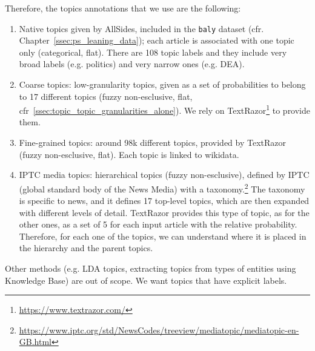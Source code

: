 Therefore, the topics annotations that we use are the following:

\begin{enumerate}
    \item Native topics given by AllSides, included in the \texttt{baly} dataset (cfr. Chapter~\ref{ssec:ps_leaning_data}); each article is associated with one topic only (categorical, flat). There are 108 topic labels and they include very broad labels (e.g. politics) and very narrow ones (e.g. DEA).
    \item Coarse topics: low-granularity topics, given as a set of probabilities to belong to 17 different topics (fuzzy non-esclusive, flat, cfr~\ref{ssec:topic_topic_granularities_alone}). We rely on TextRazor\footnote{\url{https://www.textrazor.com/}} to provide them.
    \item Fine-grained topics: around 98k different topics, provided by TextRazor (fuzzy non-esclusive, flat). Each topic is linked to wikidata.
    \item IPTC media topics: hierarchical topics (fuzzy non-esclusive),
    defined by IPTC (global standard body of the News Media) with a taxonomy.\footnote{\url{https://www.iptc.org/std/NewsCodes/treeview/mediatopic/mediatopic-en-GB.html}}
    The taxonomy is specific to news, and it defines 17 top-level topics, which are then expanded with different levels of detail. TextRazor provides this type of topic, as for the other ones, as a set of 5 for each input article with the relative probability.
    Therefore, for each one of the topics, we can understand where it is placed in the hierarchy and the parent topics.
\end{enumerate}



Other methods (e.g. LDA topics, extracting topics from types of entities using Knowledge Base) are out of scope. We want topics that have explicit labels.%

